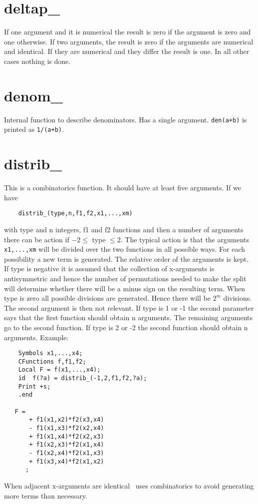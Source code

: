 
\section{deltap\_}
\label{fundeltap}
\noindent If one argument and it is numerical the result is zero if 
the argument is zero and one otherwise. If two arguments, the result is 
zero if the arguments are numerical and identical. If they are numerical and 
they differ the result is one. In all other cases nothing is done.


\section{denom\_}
\label{fundenom}
\noindent Internal function to describe denominators. Has a single 
argument. \verb:den(a+b): is printed as \verb:1/(a+b):.


\section{distrib\_}
\label{fundistrib}
\noindent This is a combinatorics function. It should 
have at least five arguments. If we have
\begin{verbatim}
    distrib_(type,n,f1,f2,x1,...,xm)
\end{verbatim}
with type and n integers, f1 and f2 functions and then a number of 
arguments there can be action if $-2 \le$ type $\le 2$. The typical action 
is that the arguments \verb:x1,...,xm: will be divided over the two 
functions in all possible ways. For each possibility a new term is 
generated. The relative order of the arguments is kept. If type is negative 
it is assumed that the collection of x-arguments is 
antisymmetric and hence the number of permutations 
needed to make the split will determine whether there will be a minus sign 
on the resulting term. When type is zero all possible divisions are 
generated. Hence there will be $2^m$ divisions. The second argument is then 
not relevant. If type is 1 or -1 the second parameter says that the first 
function should obtain n arguments. The remaining arguments go to the 
second function. If type is 2 or -2 the second function should obtain n 
arguments. Example:
\begin{verbatim}
    Symbols x1,...,x4;
    CFunctions f,f1,f2;
    Local F = f(x1,...,x4);
    id  f(?a) = distrib_(-1,2,f1,f2,?a);
    Print +s;
    .end

   F =
       + f1(x1,x2)*f2(x3,x4)
       - f1(x1,x3)*f2(x2,x4)
       + f1(x1,x4)*f2(x2,x3)
       + f1(x2,x3)*f2(x1,x4)
       - f1(x2,x4)*f2(x1,x3)
       + f1(x3,x4)*f2(x1,x2)
      ;
\end{verbatim}
When adjacent x-arguments are identical \FORM\ uses combinatorics to avoid 
generating more terms than necessary.

